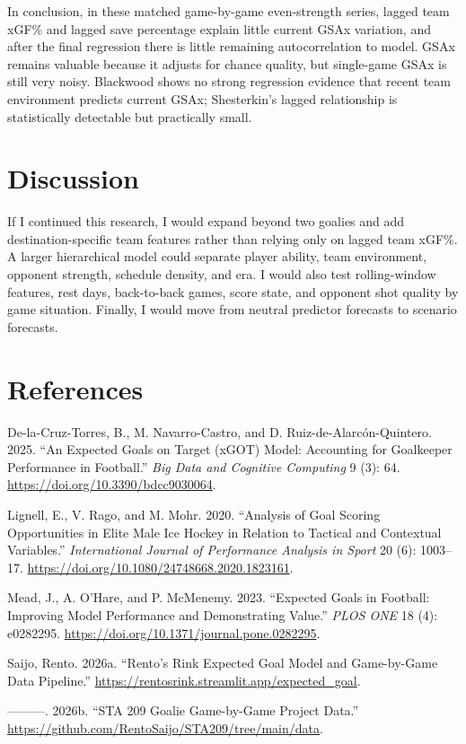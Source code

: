 \documentclass[
  10pt,
]{article}
\newlength{\cslhangindent}
\newenvironment{CSLReferences}[2] %
 {\begin{list}{}{%
  \setlength{\itemindent}{0pt}
  \setlength{\leftmargin}{0pt}
  \setlength{\parsep}{0pt}
  \ifodd #1
   \setlength{\leftmargin}{\cslhangindent}
   \setlength{\itemindent}{-1\cslhangindent}
  \fi
  \setlength{\itemsep}{#2\baselineskip}}}
 {\end{list}}
\begin{document}
In conclusion, in these matched game-by-game even-strength series, lagged team xGF\% and lagged save percentage explain little current GSAx variation, and after the final regression there is little remaining autocorrelation to model. GSAx remains valuable because it adjusts for chance quality, but single-game GSAx is still very noisy. Blackwood shows no strong regression evidence that recent team environment predicts current GSAx; Shesterkin's lagged relationship is statistically detectable but practically small.

\section{Discussion}\label{discussion}

If I continued this research, I would expand beyond two goalies and add destination-specific team features rather than relying only on lagged team xGF\%. A larger hierarchical model could separate player ability, team environment, opponent strength, schedule density, and era. I would also test rolling-window features, rest days, back-to-back games, score state, and opponent shot quality by game situation. Finally, I would move from neutral predictor forecasts to scenario forecasts.

\section{References}\label{references}

\small
\singlespacing

\label{refs}
\begin{CSLReferences}{1}{0}
De-la-Cruz-Torres, B., M. Navarro-Castro, and D. Ruiz-de-Alarcón-Quintero. 2025. {``An Expected Goals on Target (xGOT) Model: Accounting for Goalkeeper Performance in Football.''} \emph{Big Data and Cognitive Computing} 9 (3): 64. \url{https://doi.org/10.3390/bdcc9030064}.

Lignell, E., V. Rago, and M. Mohr. 2020. {``Analysis of Goal Scoring Opportunities in Elite Male Ice Hockey in Relation to Tactical and Contextual Variables.''} \emph{International Journal of Performance Analysis in Sport} 20 (6): 1003--17. \url{https://doi.org/10.1080/24748668.2020.1823161}.

Mead, J., A. O'Hare, and P. McMenemy. 2023. {``Expected Goals in Football: Improving Model Performance and Demonstrating Value.''} \emph{PLOS ONE} 18 (4): e0282295. \url{https://doi.org/10.1371/journal.pone.0282295}.

Saijo, Rento. 2026a. {``Rento's Rink Expected Goal Model and Game-by-Game Data Pipeline.''} \url{https://rentosrink.streamlit.app/expected_goal}.

---------. 2026b. {``STA 209 Goalie Game-by-Game Project Data.''} \url{https://github.com/RentoSaijo/STA209/tree/main/data}.

\end{CSLReferences}
\end{document}
